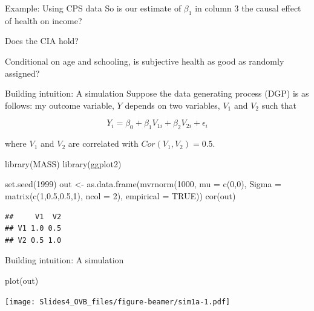 \documentclass[
  ignorenonframetext,
]{beamer}
\newenvironment{Shaded}{\begin{snugshade}}{\end{snugshade}}
\newcommand{\AttributeTok}[1]{\textcolor[rgb]{0.77,0.63,0.00}{#1}}
\newcommand{\ConstantTok}[1]{\textcolor[rgb]{0.00,0.00,0.00}{#1}}
\newcommand{\DecValTok}[1]{\textcolor[rgb]{0.00,0.00,0.81}{#1}}
\newcommand{\FloatTok}[1]{\textcolor[rgb]{0.00,0.00,0.81}{#1}}
\newcommand{\FunctionTok}[1]{\textcolor[rgb]{0.00,0.00,0.00}{#1}}
\newcommand{\NormalTok}[1]{#1}
\newcommand{\OtherTok}[1]{\textcolor[rgb]{0.56,0.35,0.01}{#1}}
\begin{document}
\begin{frame}{Example: Using CPS data}
\protect\hypertarget{example-using-cps-data-8}{}
So is our estimate of \(\beta_1\) in column 3 the causal effect of
health on income?

Does the CIA hold?

Conditional on age and schooling, is subjective health as good as
randomly assigned?
\end{frame}

\begin{frame}[fragile]{Building intuition: A simulation}
\protect\hypertarget{building-intuition-a-simulation}{}
Suppose the data generating process (DGP) is as follows: my outcome
variable, \(Y\) depends on two variables, \(V_1\) and \(V_2\) such that

\[
Y_i=\beta_0+\beta_1 V_{1i}+\beta_2 V_{2i}+\epsilon_i
\]

where \(V_1\) and \(V_2\) are correlated with \(Cor(V_1,V_2)=0.5\).

\tiny

\begin{Shaded}
\begin{Highlighting}[]
\FunctionTok{library}\NormalTok{(MASS)}
\FunctionTok{library}\NormalTok{(ggplot2)}

\FunctionTok{set.seed}\NormalTok{(}\DecValTok{1999}\NormalTok{)}
\NormalTok{out }\OtherTok{\textless{}{-}} \FunctionTok{as.data.frame}\NormalTok{(}\FunctionTok{mvrnorm}\NormalTok{(}\DecValTok{1000}\NormalTok{, }\AttributeTok{mu =} \FunctionTok{c}\NormalTok{(}\DecValTok{0}\NormalTok{,}\DecValTok{0}\NormalTok{), }
                     \AttributeTok{Sigma =} \FunctionTok{matrix}\NormalTok{(}\FunctionTok{c}\NormalTok{(}\DecValTok{1}\NormalTok{,}\FloatTok{0.5}\NormalTok{,}\FloatTok{0.5}\NormalTok{,}\DecValTok{1}\NormalTok{), }\AttributeTok{ncol =} \DecValTok{2}\NormalTok{), }
                     \AttributeTok{empirical =} \ConstantTok{TRUE}\NormalTok{))}
\FunctionTok{cor}\NormalTok{(out)}
\end{Highlighting}
\end{Shaded}

\begin{verbatim}
##     V1  V2
## V1 1.0 0.5
## V2 0.5 1.0
\end{verbatim}

\normalsize
\end{frame}

\begin{frame}[fragile]{Building intuition: A simulation}
\protect\hypertarget{building-intuition-a-simulation-1}{}
\begin{Shaded}
\begin{Highlighting}[]
\FunctionTok{plot}\NormalTok{(out)}
\end{Highlighting}
\end{Shaded}

\texttt{[image: Slides4\_OVB\_files/figure-beamer/sim1a-1.pdf]}
\end{frame}
\end{document}

